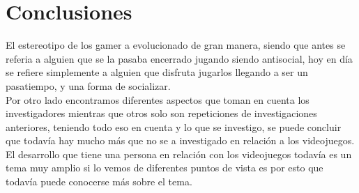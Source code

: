 \documentclass{bmcart}
\begin{document}
\section*{Conclusiones}


\begin{backmatter}

El estereotipo de los gamer a evolucionado de gran manera, siendo que antes se referia a alguien que se la pasaba encerrado jugando siendo antisocial, hoy en día se refiere simplemente a alguien que disfruta jugarlos llegando a ser un pasatiempo, y una forma de socializar.\\
Por otro lado encontramos diferentes aspectos que toman en cuenta los investigadores mientras que otros solo son repeticiones de investigaciones anteriores, teniendo todo eso en cuenta y lo que se investigo, se puede concluir que todavía hay mucho más que no se a investigado en relación a los videojuegos.\\
El desarrollo que tiene una persona en relación con los videojuegos todavía es un tema muy amplio si lo vemos de diferentes puntos de vista es por esto que todavía puede conocerse más sobre el tema.






\end{backmatter}
\end{document}
